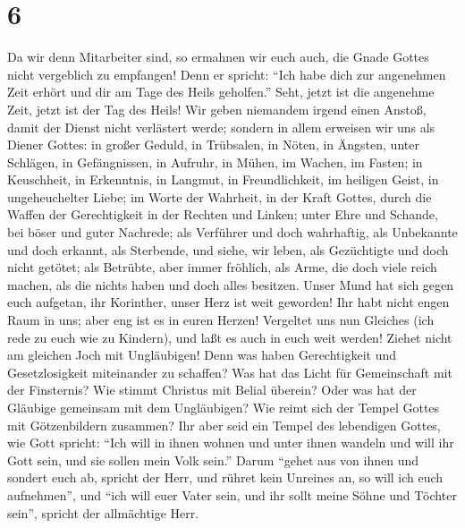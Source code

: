 \hypertarget{section-5}{%
\section{6}\label{section-5}}

 Da wir denn Mitarbeiter sind, so ermahnen wir euch auch,
die Gnade Gottes nicht vergeblich zu empfangen!  Denn er
spricht: ``Ich habe dich zur angenehmen Zeit erhört und dir am Tage des
Heils geholfen.'' Seht, jetzt ist die angenehme Zeit, jetzt ist der Tag
des Heils!  Wir geben niemandem irgend einen Anstoß, damit
der Dienst nicht verlästert werde;  sondern in allem
erweisen wir uns als Diener Gottes: in großer Geduld, in Trübsalen, in
Nöten, in Ängsten,  unter Schlägen, in Gefängnissen, in
Aufruhr, in Mühen, im Wachen, im Fasten;  in Keuschheit,
in Erkenntnis, in Langmut, in Freundlichkeit, im heiligen Geist, in
ungeheuchelter Liebe;  im Worte der Wahrheit, in der Kraft
Gottes, durch die Waffen der Gerechtigkeit in der Rechten und Linken;
 unter Ehre und Schande, bei böser und guter Nachrede; als
Verführer und doch wahrhaftig,  als Unbekannte und doch
erkannt, als Sterbende, und siehe, wir leben, als Gezüchtigte und doch
nicht getötet;  als Betrübte, aber immer fröhlich, als
Arme, die doch viele reich machen, als die nichts haben und doch alles
besitzen.  Unser Mund hat sich gegen euch aufgetan, ihr
Korinther, unser Herz ist weit geworden!  Ihr habt nicht
engen Raum in uns; aber eng ist es in euren Herzen! 
Vergeltet uns nun Gleiches (ich rede zu euch wie zu Kindern), und laßt
es auch in euch weit werden!  Ziehet nicht am gleichen
Joch mit Ungläubigen! Denn was haben Gerechtigkeit und Gesetzlosigkeit
miteinander zu schaffen? Was hat das Licht für Gemeinschaft mit der
Finsternis?  Wie stimmt Christus mit Belial überein? Oder
was hat der Gläubige gemeinsam mit dem Ungläubigen?  Wie
reimt sich der Tempel Gottes mit Götzenbildern zusammen? Ihr aber seid
ein Tempel des lebendigen Gottes, wie Gott spricht: ``Ich will in ihnen
wohnen und unter ihnen wandeln und will ihr Gott sein, und sie sollen
mein Volk sein.''  Darum ``gehet aus von ihnen und
sondert euch ab, spricht der Herr, und rühret kein Unreines an, so will
ich euch aufnehmen'',  und ``ich will euer Vater sein,
und ihr sollt meine Söhne und Töchter sein'', spricht der allmächtige
Herr.

